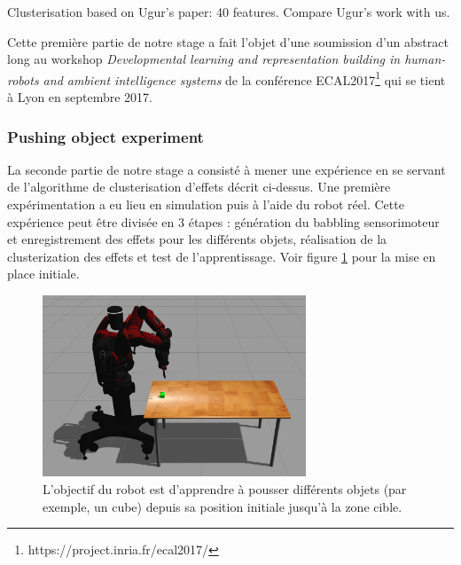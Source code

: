 \documentclass{llncs}
\newcommand*\circled[1]{\tikz[baseline=(char.base)]{
            \node[shape=circle,draw,inner sep=2pt] (char) {#1};}}
\begin{document}
Clusterisation based on Ugur's paper: 40 features. Compare Ugur's work with us.

Cette première partie de notre stage a fait l'objet d'une soumission d'un abstract long au workshop \textit{Developmental learning and representation building in human-robots and ambient intelligence systems} de la conférence ECAL2017\footnote{https://project.inria.fr/ecal2017/} qui se tient à Lyon en septembre 2017.



\subsubsection{Pushing object experiment}
La seconde partie de notre stage a consisté à mener une expérience en se servant de l'algorithme de clusterisation d'effets décrit ci-dessus. Une première expérimentation a eu lieu en simulation puis à l'aide du robot réel. Cette expérience peut être divisée en 3 étapes : \circled{1} génération du babbling sensorimoteur et enregistrement des effets pour les différents objets, \circled{2} réalisation de la clusterization des effets et \circled{3} test de l'apprentissage.  Voir figure \ref{fig7} pour la mise en place initiale.

\begin{figure}[ht]
  \begin{center}
  \includegraphics[width=0.7\textwidth]{figures/Experiment_setup.png}
  \caption{L'objectif du robot est d'apprendre à pousser différents objets (par exemple, un cube) depuis sa position initiale jusqu'à la zone cible.}
  \label{fig7}
  \end{center}
\end{figure}
\end{document}

